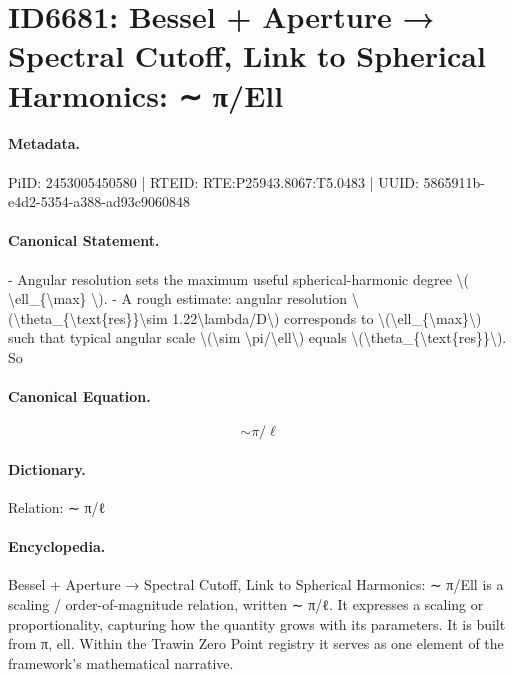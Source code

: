 \section*{ID6681: Bessel + Aperture → Spectral Cutoff, Link to Spherical Harmonics: ∼ π/Ell}
\paragraph{Metadata.}
PiID: 2453005450580 | RTEID: RTE:P25943.8067:T5.0483 | UUID: 5865911b-e4d2-5354-a388-ad93c9060848

\paragraph{Canonical Statement.}
- Angular resolution sets the maximum useful spherical-harmonic degree \textbackslash{}( \textbackslash{}ell\_\{\textbackslash{}max\} \textbackslash{}). - A rough estimate: angular resolution \textbackslash{}(\textbackslash{}theta\_\{\textbackslash{}text\{res\}\}\textbackslash{}sim 1.22\textbackslash{}lambda/D\textbackslash{}) corresponds to \textbackslash{}(\textbackslash{}ell\_\{\textbackslash{}max\}\textbackslash{}) such that typical angular scale \textbackslash{}(\textbackslash{}sim \textbackslash{}pi/\textbackslash{}ell\textbackslash{}) equals \textbackslash{}(\textbackslash{}theta\_\{\textbackslash{}text\{res\}\}\textbackslash{}). So

\paragraph{Canonical Equation.}
\[
\sim \pi/\ell
\]

\paragraph{Dictionary.}
Relation: ∼ π/ℓ

\paragraph{Encyclopedia.}
Bessel + Aperture → Spectral Cutoff, Link to Spherical Harmonics: ∼ π/Ell is a scaling / order-of-magnitude relation, written ∼ π/ℓ. It expresses a scaling or proportionality, capturing how the quantity grows with its parameters. It is built from π, ell. Within the Trawin Zero Point registry it serves as one element of the framework's mathematical narrative.
